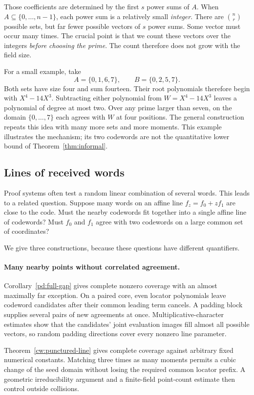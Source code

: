 \documentclass[11pt,letterpaper]{article}
\theoremstyle{definition}
\theoremstyle{remark}
\begin{document}
Those coefficients are determined by the first $s$ power sums of $A$.
When $A\subseteq\{0,\ldots,n-1\}$, each power sum is a relatively
small \emph{integer}. There are $\binom nr$ possible sets, but far
fewer possible vectors of $s$ power sums. Some vector must occur many
times. The crucial point is that we count these vectors over the
integers \emph{before choosing the prime}. The count therefore does
not grow with the field size.

For a small example, take
\[
 A=\{0,1,6,7\},\qquad B=\{0,2,5,7\}.
\]
Both sets have size four and sum fourteen. Their root polynomials
therefore begin with $X^4-14X^3$. Subtracting either polynomial from
$W=X^4-14X^3$ leaves a polynomial of degree at most two. Over any prime
larger than seven, on the domain $\{0,\ldots,7\}$ each agrees with $W$
at four positions. The general construction repeats this idea with
many more sets and more moments. This example illustrates the
mechanism; its two codewords are not the quantitative lower bound of
Theorem~\ref{thm:informal}.

\subsection{Lines of received words}

Proof systems often test a random linear combination of several words.
This leads to a related question. Suppose many words on an affine line
$f_z=f_0+zf_1$ are close to the code. Must the nearby codewords fit
together into a single affine line of codewords? Must $f_0$ and $f_1$
agree with two codewords on a large common set of coordinates?

We give three constructions, because these questions have different
quantifiers.

\paragraph{Many nearby points without correlated agreement.}
Corollary~\ref{pd:full-gap} gives complete nonzero coverage with an
almost maximally far exception. On a paired core, even locator
polynomials leave codeword candidates after their common leading term
cancels. A padding block supplies several pairs of new agreements at
once. Multiplicative-character estimates show that the candidates'
joint evaluation images fill almost all possible vectors, so random
padding directions cover every nonzero line parameter.

Theorem~\ref{cw:punctured-line} gives complete coverage against
arbitrary fixed numerical constants. Matching three times as many
moments permits a cubic change of the seed domain without losing the
required common locator prefix. A geometric irreducibility argument
and a finite-field point-count estimate then control outside collisions.
\end{document}
